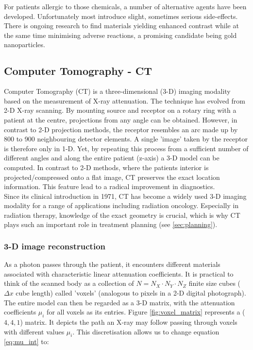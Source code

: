 For patients allergic to those chemicals, a number of alternative agents have been developed.
Unfortunately most introduce slight, sometimes serious side-effects.
There is ongoing research to find materials yielding enhanced contrast while at the same time minimising adverse reactions, a promising candidate being gold nanoparticles.


\subsection{Computer Tomography - CT}
Computer Tomography (CT) is a three-dimensional (3-D) imaging modality based on the measurement of X-ray attenuation.
The technique has evolved from 2-D X-ray scanning.
By mounting source and receptor on a rotary ring with a patient at the centre, projections from any angle can be obtained.
However, in contrast to 2-D projection methods, the receptor resembles an arc made up by 800 to 900 neighbouring detector elements.
A single 'image' taken by the receptor is therefore only in 1-D.
Yet, by repeating this process from a sufficient number of different angles and along the entire patient (z-axis) a 3-D model can be computed.
In contrast to 2-D methods, where the patients interior is projected/compressed onto a flat image, CT preserves the exact location information. This feature lead to a radical improvement in diagnostics.	 \\

Since its clinical introduction in 1971, CT has become a widely used 3-D imaging modality for a range of applications including radiation oncology. Especially in radiation therapy, knowledge of the exact geometry is crucial, which is why CT plays such an important role in treatment planning (see \ref{sec:planning}).

\subsubsection{3-D image reconstruction}
As a photon passes through the patient, it encounters different materials associated with characteristic linear attenuation coefficients.
It is practical to think of the scanned body as a collection of $N = N_X\cdot N_Y\cdot N_Z$ finite size cubes ($\Delta x$ cube length) called 'voxels' (analogous to pixels in a 2-D digital photograph).
The entire model can then be regarded as a 3-D matrix, with the attenuation coefficients $\mu_i$ for all voxels as its entries.
Figure \ref{fig:voxel_matrix} represents a ($4, 4, 1$) matrix.
It depicts the path an X-ray may follow passing through voxels with different values $\mu_i$.
This discretisation allows us to change equation \ref{eq:mu_int} to:

